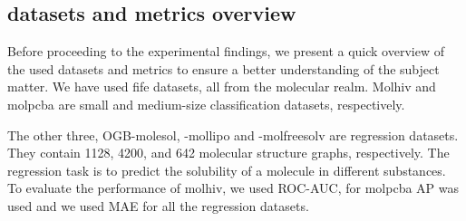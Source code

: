 \subsection{datasets and metrics overview}

Before proceeding to the experimental findings, we present a quick overview of the used datasets and metrics to ensure a better understanding of the subject matter. We have used fife datasets, all from the molecular realm. Molhiv and molpcba are small and medium-size classification datasets, respectively.

The other three, OGB-molesol, -mollipo and -molfreesolv are regression datasets. They contain 1128, 4200, and 642
molecular structure graphs, respectively. The regression task is to predict the solubility
of a molecule in different substances.
To evaluate the performance of molhiv, we used ROC-AUC, for molpcba AP was used and we used MAE for all the regression datasets.


\newcommand*{\layerplot}[4]{\begin{tikzpicture}
        \begin{axis}[
                width=0.8\linewidth,
                height=6cm,
                xlabel={#3},
                ylabel={#4},
                legend pos=outer north east,
                legend style={nodes={scale=0.6, transform shape}},
                grid=major,
            ]

            \addplot[color= p_red] plot[error bars/.cd, y dir=both, y explicit] table [x=#2, y=noneAvg, col sep=semicolon,  y error=noneStd] {#1};
            \addlegendentry{No Regularization}

            \addplot[color= p_green] plot[error bars/.cd, y dir=both, y explicit] table [x=#2, y=dropoutAvg, col sep=semicolon,  y error=dropoutStd] {#1};
            \addlegendentry{Dropout}

            \addplot[color= p_blue] plot[error bars/.cd, y dir=both, y explicit] table [x=#2, y=nodesamplingAvg, col sep=semicolon,  y error=nodesamplingStd] {#1};
            \addlegendentry{Node Sampling}

            \addplot[color= p_yellow] plot[error bars/.cd, y dir=both, y explicit] table [x=#2, y=dropedgeAvg, col sep=semicolon,  y error=dropedgeStd] {#1};
            \addlegendentry{DropEdge}

            \addplot[color= p_violet] plot[error bars/.cd, y dir=both, y explicit] table [x=#2, y=gdcAvg, col sep=semicolon,  y error=gdcStd] {#1};
            \addlegendentry{GDC}

        \end{axis}
    \end{tikzpicture}}

